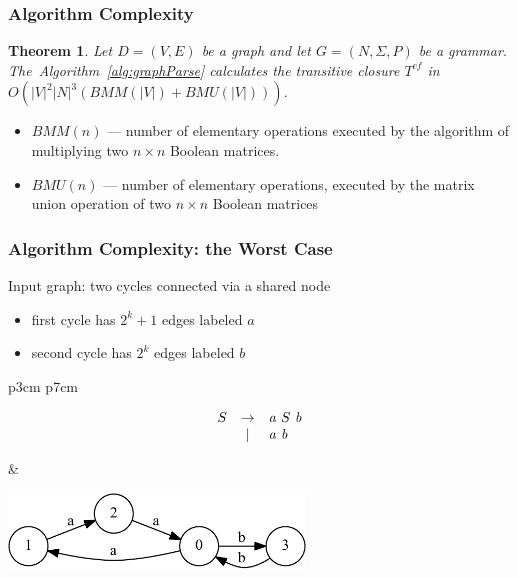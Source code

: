 \documentclass[xcolor=table]{beamer}
\newtheorem{mytheorem}{Theorem}
\begin{document}
\begin{frame}
  \transwipe[direction=90]
  \frametitle{Algorithm Complexity}
\begin{mytheorem}
 Let $D = (V,E)$ be a graph and let $G =(N,\Sigma,P)$ be a grammar. The~Algorithm~\ref{alg:graphParse} calculates the transitive closure $T^{cf}$ in $O(|V|^2|N|^3(BMM(|V|) + BMU(|V|)))$.
\end{mytheorem}

\begin{itemize}
  \item $BMM(n)$ --- number of elementary operations executed by the
algorithm of multiplying two $n \times n$ Boolean matrices.
  \item $BMU(n)$ --- number of elementary operations, executed by the matrix union
operation of two $n \times n$ Boolean matrices
\end{itemize}

\end{frame}
       

\begin{frame}[fragile]
  \transwipe[direction=90]
  \frametitle{Algorithm Complexity: the Worst Case}



Input graph: two cycles connected via a shared node

\begin{itemize}
	\item first cycle has $2^k + 1$ edges labeled $a$
	\item second cycle has $2^k$ edges labeled $b$
\end{itemize}


\begin{tabular}{p{3cm} p{7cm} }
\begin{figure}[h]
	\[
	\begin{array}{ccl}
	S & \rightarrow & \text{\emph{a}} \ S \ \text{\emph{b}} \\
	  & |           & \text{\emph{a}} \ \text{\emph{b}} \\ 
	\end{array}
	\]
	
\end{figure}

& 

\begin{center}
  \includegraphics[height=2cm]{pictures/example_graph.pdf}
\end{center}
  \end{tabular}
\end{frame}       
       
\end{document}
